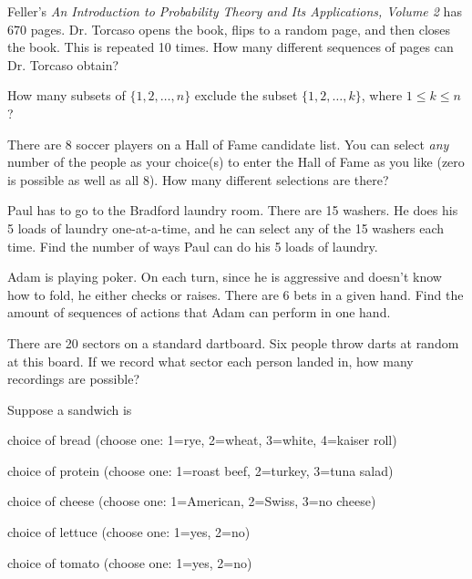 \documentclass[12pt]{article}
\begin{document}
 Feller's \textit{An Introduction to Probability Theory and Its Applications, Volume 2} has 670 pages. Dr. Torcaso opens the book, flips to a random page, and then closes the book. This is repeated 10 times. How many different sequences of pages can Dr. Torcaso obtain?\medskip

 How many subsets of $\{1,2,\dots,n\}$ exclude the subset $\{1,2,\dots, k\}$, where $1 \leq k \leq n$?\medskip

 There are $8$ soccer players on a Hall of Fame candidate list. You can select {\em any} number of the people as your choice(s) to enter the Hall of Fame as you like (zero is possible as well as all 8). How many different selections are there?\medskip


 Paul has to go to the Bradford laundry room. There are 15 washers. He does his 5 loads of laundry one-at-a-time, and he can select any of the 15 washers each time. Find the number of ways Paul can do his 5 loads of laundry.\medskip

 Adam is playing poker. On each turn, since he is aggressive and doesn't know how to fold, he either checks or raises. There are 6 bets in a given hand. Find the amount of sequences of actions that Adam can perform in one hand.\medskip

 There are 20 sectors on a standard dartboard. Six people throw darts at random at this board. If we record what sector each person landed in, how many recordings are possible?\medskip

 Suppose a sandwich is

choice of bread (choose one: 1=rye, 2=wheat, 3=white, 4=kaiser roll)

choice of protein (choose one: 1=roast beef, 2=turkey, 3=tuna salad)

choice of cheese (choose one: 1=American, 2=Swiss, 3=no cheese)

choice of lettuce (choose one: 1=yes, 2=no)

choice of tomato (choose one: 1=yes, 2=no)
\end{document}
